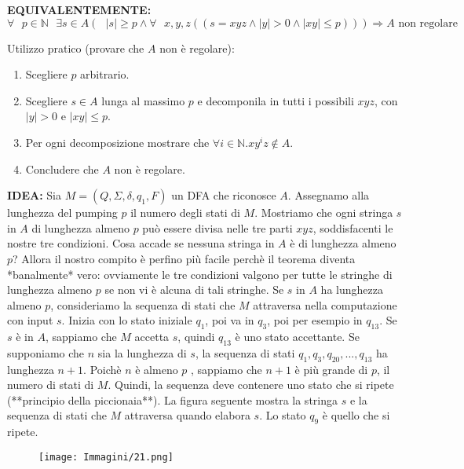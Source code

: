 \documentclass{article}
\begin{document}
\textbf{EQUIVALENTEMENTE:}
$$
\forall\text{ }p \in \mathbb{N}\text{ }\exists s\in A(\text{ }|s| \geq p \wedge \forall \text{ }x,y,z ((s = xyz \wedge |y| > 0 \wedge |xy| \leq p))) \Rightarrow A \text{ non regolare}
$$
\vspace{1em}

Utilizzo pratico (provare che $A$ non è regolare):
\begin{enumerate}
    \item Scegliere $p$ arbitrario.
    \item Scegliere $s \in A$ lunga al massimo $p$ e decomponila in tutti i possibili $xyz$, con $|y| > 0$ e $|xy| \leq p$.
    \item Per ogni decomposizione mostrare che $\forall i\in \mathbb{N}.xy^{i}z \notin A$.
    \item Concludere che $A$ non è regolare.
\end{enumerate}
\vspace{1em}

\textbf{IDEA:}
Sia $M = (Q,\Sigma,\delta,q_{1},F)$ un DFA che riconosce $A$. Assegnamo alla lunghezza del pumping $p$ il numero degli stati di $M$. Mostriamo che ogni stringa $s$ in $A$ di lunghezza almeno $p$ può essere divisa nelle tre parti $xyz$, soddisfacenti le nostre tre condizioni. Cosa accade se nessuna stringa in $A$ è di lunghezza almeno $p$? Allora il nostro compito è perfino più facile perchè il teorema diventa *banalmente* vero: ovviamente le tre condizioni valgono per tutte le stringhe di lunghezza almeno $p$ se non vi è alcuna di tali stringhe.
Se $s$ in $A$ ha lunghezza almeno $p$, consideriamo la sequenza di stati che $M$ attraversa nella computazione con input $s$. Inizia con lo stato iniziale $q_{1}$, poi va in $q_{3}$, poi per esempio in $q_{13}$. Se $s$ è in $A$, sappiamo che $M$ accetta $s$, quindi $q_{13}$ è uno stato accettante.
Se supponiamo che $n$ sia la lunghezza di $s$, la sequenza di stati $q_{1},q_{3},q_{20},...,q_{13}$ ha lunghezza $n+1$. Poichè $n$ è almeno $p$ , sappiamo che $n+1$ è più grande di $p$, il numero di stati di $M$. Quindi, la sequenza deve contenere uno stato che si ripete (**principio della piccionaia**).
La figura seguente mostra la stringa $s$ e la sequenza di stati che $M$ attraversa quando elabora $s$. Lo stato $q_{9}$ è quello che si ripete.

\begin{figure}[H]
    \centering
    \texttt{[image: Immagini/21.png]}
    \label{fig:your_image}
\end{figure}
\end{document}
